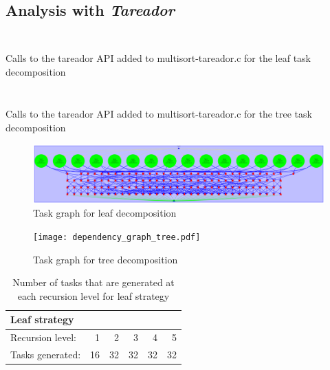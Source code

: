 \subsection{Analysis with \emph{Tareador}}

\begin{listing}[H]
\inputminted[firstline=20,lastline=31]{c}{sources/multisort-tareador-leaf.c}
\inputminted[firstline=33,lastline=51]{c}{sources/multisort-tareador-leaf.c}
\caption{Calls to the tareador API added to multisort-tareador.c for the leaf task decomposition}
\label{listing:tareador_leaf}
\end{listing}

\begin{listing}[H]
\inputminted[firstline=20,lastline=31]{c}{sources/multisort-tareador-tree.c}
\inputminted[firstline=33,lastline=51]{c}{sources/multisort-tareador-tree.c}
\caption{Calls to the tareador API added to multisort-tareador.c for the tree task decomposition}
\label{listing:tareador_leaf}
\end{listing}

\begin{figure}[H]
\centering
\includegraphics[width=\textwidth]{dependency_graph_leaf.pdf}
\caption{Task graph for leaf decomposition}
\label{fig:tar_tasks_leaf}
\end{figure}

\begin{figure}[H]
\centering
\texttt{[image: dependency\_graph\_tree.pdf]}
\caption{Task graph for tree decomposition}
\label{fig:tar_tasks_tree}
\end{figure}

\begin{table}[H]
\centering
\begin{tabular}{lrrrrr}
\toprule
Leaf strategy & & & & & \\
\midrule
Recursion level:        & 1     & 2     & 3     & 4     & 5  \\
Tasks generated:    & 16    & 32    & 32    & 32    & 32 \\
\bottomrule
\end{tabular}

\caption{Number of tasks that are generated at each recursion level for leaf strategy} 
\label{tab:tasks_leaf}
\end{table}

